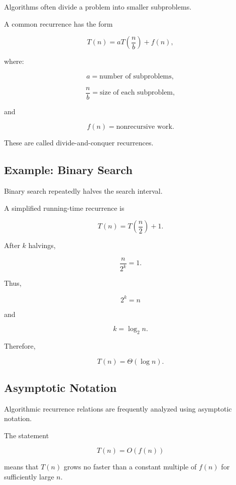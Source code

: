 Algorithms often divide a problem into smaller subproblems.

A common recurrence has the form

\[
\boxed{
T(n)
=
aT\left(\frac{n}{b}\right)
+
f(n),
}
\]

where:

\[
a
=
\text{number of subproblems},
\]

\[
\frac{n}{b}
=
\text{size of each subproblem},
\]

and

\[
f(n)
=
\text{nonrecursive work}.
\]

These are called divide-and-conquer recurrences.

\subsection{Example: Binary Search}
\label{subsec:binary-search-recurrence}

Binary search repeatedly halves the search interval.

A simplified running-time recurrence is

\[
\boxed{
T(n)
=
T\left(\frac n2\right)
+
1.
}
\]

After \(k\) halvings,

\[
\frac{n}{2^k}=1.
\]

Thus,

\[
2^k=n
\]

and

\[
k=\log_2 n.
\]

Therefore,

\[
\boxed{
T(n)=\Theta(\log n).
}
\]

\subsection{Asymptotic Notation}
\label{subsec:recurrence-asymptotic-notation}

Algorithmic recurrence relations are frequently analyzed using
asymptotic notation.

The statement

\[
T(n)=O(f(n))
\]

means that \(T(n)\) grows no faster than a constant multiple of \(f(n)\)
for sufficiently large \(n\).

